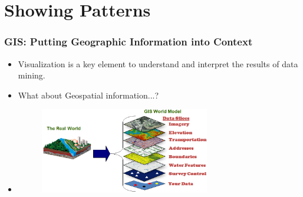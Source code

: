 \documentclass[hyperref={pdfpagelabels=true}]{beamer}
\begin{document}
\section{Showing Patterns} 
\begin{frame}

\frametitle{GIS: Putting Geographic Information into Context}
    \begin{itemize}
      \item<1->Visualization is a key element to understand and interpret the results of data mining.%
      \item<2->What about Geospatial information...?
      \item<3->\begin{figure}  
	\includegraphics[width=0.7\textwidth]{gis.PNG}
       \end{figure}  
    \end{itemize}
\end{frame}
\end{document}
